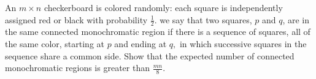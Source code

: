 An $m\times n$ checkerboard is colored randomly: each square is independently assigned red or black with probability $\frac12.$ we say that two squares, $p$ and $q$, are in the same connected monochromatic region if there is a sequence of squares, all of the same color, starting at $p$ and ending at $q,$ in which successive squares in the sequence share a common side. Show that the expected number of connected monochromatic regions is greater than $\frac{mn}8.$